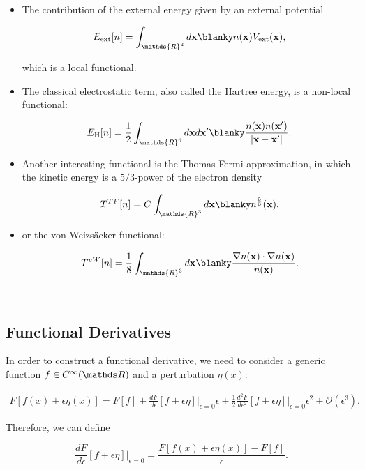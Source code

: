 \documentclass{homework}
\begin{document}
\begin{itemize}
    \item The contribution of the external energy given by an external potential
    
    $$
    E_{\textnormal{ext}}[n] = \int_{\mathds{R}^3} d{\bf x}  \blanky n({\bf x}) V_{\textnormal{ext}}({\bf x}),
    $$
    
    which is a local functional.
    \item The classical electrostatic term, also called the Hartree energy, is a non-local functional:
    
    $$
    E_{\textnormal{H}}[n] = \frac{1}{2} \int_{\mathds{R}^6} d{\bf x} d{\bf x}' \blanky \frac{n({\bf x})n({\bf x'})}{|{\bf x}-{\bf x}'|}.
    $$
    
    \item Another interesting functional is the Thomas-Fermi approximation, in which the kinetic energy is a $5/3$-power of the electron density
    
    $$
    T^{TF}[n] = C \int_{\mathds{R}^3} d{\bf x} \blanky n^{\frac{5}{3}}({\bf x}),
    $$
    
    \item or the von Weizs\"acker functional:
    
    $$
    T^{vW}[n] = \frac{1}{8} \int_{\mathds{R}^3} d{\bf x} \blanky \frac{\nabla n({\bf x}) \cdot \nabla n({\bf x})}{n({\bf x})}. 
    $$
\end{itemize}

\blanky \\

\subsection{Functional Derivatives}

In order to construct a functional derivative, we need to consider a generic function $f \in C^{\infty}(\R)$ and a perturbation $\eta(x)$:

\begin{align*}
    F[f(x) + \epsilon \eta(x)] = F[f] + \frac{dF}{d\epsilon}[f+\epsilon \eta]\bigg|_{\epsilon = 0} \epsilon + \frac{1}{2} \frac{d^2 F}{d\epsilon^2}[f+\epsilon \eta]\bigg|_{\epsilon = 0} \epsilon^2 + \mathcal{O}(\epsilon^3).
\end{align*}

Therefore, we can define 

$$
\frac{dF}{d\epsilon}[f+\epsilon \eta]\bigg|_{\epsilon = 0} = \frac{ F[f(x) + \epsilon \eta(x)]  - F[f]}{\epsilon}.
$$
\end{document}
